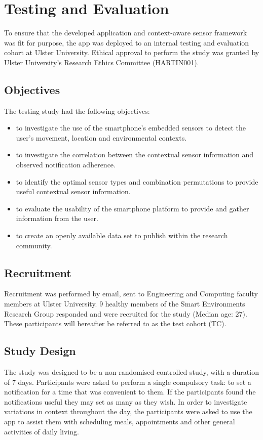 \section{Testing and Evaluation}
To ensure that the developed application and context-aware sensor framework was fit for purpose, the app was deployed to an internal testing and evaluation cohort at Ulster University. Ethical approval to perform the study was granted by Ulster University's Research Ethics Committee (HARTIN001).

\subsection{Objectives}
The testing study had the following objectives:
\begin{itemize}[noitemsep,topsep=0pt]
  \item to investigate the use of the smartphone’s embedded sensors to detect the user’s movement, location and environmental contexts.
  \item to investigate the correlation between the contextual sensor information and observed notification adherence.
  \item to identify the optimal sensor types and combination permutations to provide useful contextual sensor information.
  \item to evaluate the usability of the smartphone platform to provide and gather information from the user.
  \item to create an openly available data set to publish within the research community.
\end{itemize}

\subsection{Recruitment}
Recruitment was performed by email, sent to Engineering and Computing faculty members at Ulster University. 9 healthy members of the Smart Environments Research Group responded and were recruited for the study (Median age: 27). These participants will hereafter be referred to as the test cohort (TC).

\subsection{Study Design}
The study was designed to be a non-randomised controlled study, with a duration of 7 days. Participants were asked to perform a single compulsory task: to set a notification for a time that was convenient to them. If the participants found the notifications useful they may set as many as they wish. In order to investigate variations in context throughout the day, the participants were asked to use the app to assist them with scheduling meals, appointments and other general activities of daily living.

